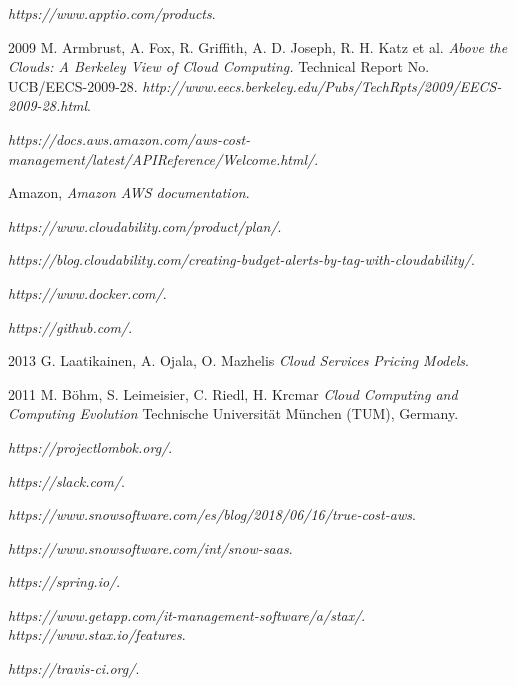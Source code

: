 \documentclass[licencjacka,en]{thesisclass}
\begin{document}
    \begin{thebibliography}{99}

        \textit{https://www.apptio.com/products}.

        2009 M. Armbrust, A. Fox, R. Griffith, A. D. Joseph, R. H. Katz et al.
        \textit{Above the Clouds: A Berkeley View of Cloud Computing.}
        Technical Report No. UCB/EECS-2009-28.
        \textit{http://www.eecs.berkeley.edu/Pubs/TechRpts/2009/EECS-2009-28.html}.

        \textit{https://docs.aws.amazon.com/aws-cost-management/latest/APIReference/Welcome.html/}.

        Amazon,
        \textit{Amazon AWS documentation}.

        \textit{https://www.cloudability.com/product/plan/}.

        \textit{https://blog.cloudability.com/creating-budget-alerts-by-tag-with-cloudability/}.

        \textit{https://www.docker.com/}.

        \textit{https://github.com/}.

        2013 G. Laatikainen, A. Ojala, O. Mazhelis
        \textit{Cloud Services Pricing Models}.

        2011 M. Böhm, S. Leimeisier, C. Riedl, H. Krcmar
        \textit{Cloud Computing and Computing Evolution}
        Technische Universität München (TUM), Germany.

        \textit{https://projectlombok.org/}.

        \textit{https://slack.com/}.

        \textit{https://www.snowsoftware.com/es/blog/2018/06/16/true-cost-aws}.

        \textit{https://www.snowsoftware.com/int/snow-saas}.

        \textit{https://spring.io/}.

        \textit{https://www.getapp.com/it-management-software/a/stax/}.
        \textit{https://www.stax.io/features}.

        \textit{https://travis-ci.org/}.

    \end{thebibliography}
\end{document}
